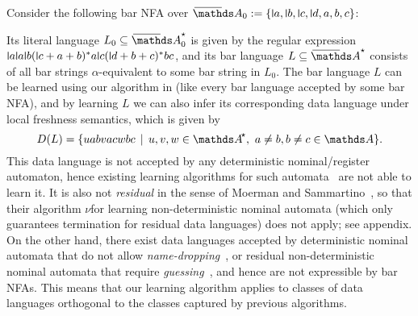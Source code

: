 \documentclass[a4paper,UKenglish,cleveref,autoref,thm-restate,numberwithinsect,final]{lipics-v2021}
\begin{document}
    \begin{expl} \label{ex:nonresidual}
      Consider the following bar NFA over $\barNames_0 := \set{\newletter{a},\newletter{b},
        \newletter{c},\newletter{d},a,b,c}$:
      \begin{center}
      \end{center}
Its literal language $L_0\seq \barAs_0$ is given by the regular expression $\newletter a \newletter a \newletter b (\newletter c + a + b)^* a\newletter c(\newletter d + b + c)^*bc$, and its bar language $L\seq \barAs$ consists of all bar strings $\alpha$-equivalent to some bar string in $L_0$. The bar language $L$ can be learned using our algorithm in  (like every bar language accepted by some bar NFA), and by learning $L$ we can also infer its corresponding data language under local freshness semantics, which is given by
      \[ D(L) = \setw{{u}ab{v}ac{w}bc}{{u}, {v}, {w} \in \Ats,\ 
          a \neq b, b \neq c \in \names}. \]
This data language is not accepted by any deterministic nominal/register automaton, hence existing learning algorithms for such automata~\cite{DBLP:conf/tacas/DierlFHJST24,CasselHJS16,CEGAR12,mssks17} are not able to learn it.
It is also not \emph{residual} in the sense of Moerman and Sammartino~\cite{ms22}, so that their algorithm $\nu$\NLstar for learning non-deterministic nominal automata (which only guarantees termination for residual data languages) does not apply; see appendix. On the other hand, there exist data languages accepted by deterministic nominal automata that do not allow \emph{name-dropping}~\cite{skmw17}, or residual non-deterministic nominal automata that require \emph{guessing}~\cite[Sec.~3]{ms22}, and hence are not expressible by bar NFAs. This means that our learning algorithm applies to classes of data languages orthogonal to the classes captured by previous algorithms.
    \end{expl}
\end{document}
